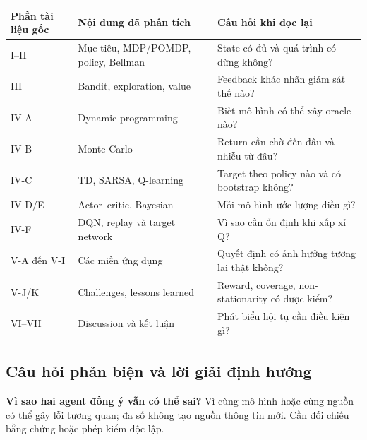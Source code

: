 {\def\LTcaptype{none} %
\begin{longtable}[]{@{}
  >{\raggedright\arraybackslash}p{}
  >{\raggedright\arraybackslash}p{}
  >{\raggedright\arraybackslash}p{}@{}}
\toprule\noalign{}
\begin{minipage}[b]{\linewidth}\raggedright
Phần tài liệu gốc
\end{minipage} & \begin{minipage}[b]{\linewidth}\raggedright
Nội dung đã phân tích
\end{minipage} & \begin{minipage}[b]{\linewidth}\raggedright
Câu hỏi khi đọc lại
\end{minipage} \\
\midrule\noalign{}
\endhead
\bottomrule\noalign{}
\endlastfoot
I--II & Mục tiêu, MDP/POMDP, policy, Bellman & State có đủ và quá trình
có dừng không? \\
III & Bandit, exploration, value & Feedback khác nhãn giám sát thế
nào? \\
IV-A & Dynamic programming & Biết mô hình có thể xây oracle nào? \\
IV-B & Monte Carlo & Return cần chờ đến đâu và nhiễu từ đâu? \\
IV-C & TD, SARSA, Q-learning & Target theo policy nào và có bootstrap
không? \\
IV-D/E & Actor--critic, Bayesian & Mỗi mô hình ước lượng điều gì? \\
IV-F & DQN, replay và target network & Vì sao cần ổn định khi xấp xỉ
Q? \\
V-A đến V-I & Các miền ứng dụng & Quyết định có ảnh hưởng tương lai thật
không? \\
V-J/K & Challenges, lessons learned & Reward, coverage, non-stationarity
có được kiểm? \\
VI--VII & Discussion và kết luận & Phát biểu hội tụ cần điều kiện gì? \\
\end{longtable}
}

\subsection{Câu hỏi phản biện và lời giải định
hướng}\label{cuxe2u-hux1ecfi-phux1ea3n-biux1ec7n-vuxe0-lux1eddi-giux1ea3i-ux111ux1ecbnh-hux1b0ux1edbng}

\textbf{Vì sao hai agent đồng ý vẫn có thể sai?} Vì cùng mô hình hoặc
cùng nguồn có thể gây lỗi tương quan; đa số không tạo nguồn thông tin
mới. Cần đối chiếu bằng chứng hoặc phép kiểm độc lập.

